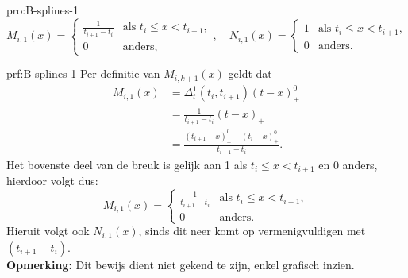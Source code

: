 \begin{pro}{pro:B-splines-1}
    \begin{equation*}
        M_{i,1}(x) = \begin{cases}
            \frac{1}{t_{i+1}-t_i} & \text{als } t_i \leq x < t_{i+1}, \\
            0 & \text{anders},
        \end{cases}, \quad 
        N_{i,1}(x) = \begin{cases}
            1 & \text{als } t_i \leq x < t_{i+1}, \\
            0 & \text{anders}.
        \end{cases}
    \end{equation*}
\end{pro}

\begin{prf}{prf:B-splines-1}
    Per definitie van $M_{i,k+1}(x)$ geldt dat
    \begin{align*}
        M_{i,1}(x) 
            &= \Delta_t^1(t_i,t_{i+1}) (t-x)^0_+ \\
            &= \frac{1}{t_{i+1}-t_i} (t-x)_+ \\
            &= \frac{(t_{i+1} - x)^0_+ - (t_i - x)^0_+}{t_{i+1}-t_i}.
    \end{align*} 
    Het bovenste deel van de breuk is gelijk aan 1 als $t_i \leq x < t_{i+1}$ en 0 anders, hierdoor volgt dus:
    \begin{equation*}
        M_{i,1}(x) = \begin{cases}
            \frac{1}{t_{i+1}-t_i} & \text{als } t_i \leq x < t_{i+1}, \\
            0 & \text{anders}.
        \end{cases}
    \end{equation*}
    Hieruit volgt ook $N_{i,1}(x)$, sinds dit neer komt op vermenigvuldigen met $(t_{i+1} - t_i)$. \\

    \textbf{Opmerking:}  Dit bewijs dient niet gekend te zijn, enkel grafisch inzien.
\end{prf}

